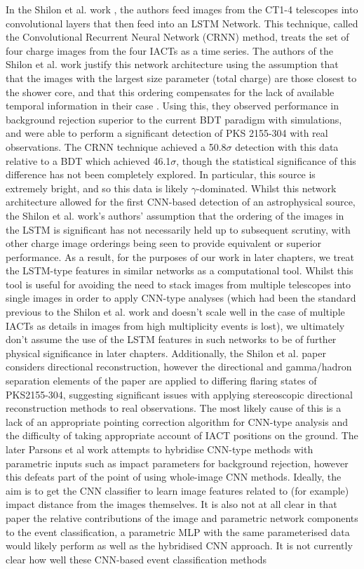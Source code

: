 In the Shilon et al. work \cite{Shilon}, the authors feed images from the CT1-4 telescopes into convolutional layers that then feed into an LSTM Network. This technique, called the Convolutional Recurrent Neural Network (CRNN) method, treats the set of four charge images from the four IACTs as a time series. The authors of the Shilon et al. work justify this network architecture using the assumption that that the images with the largest size parameter (total charge) are those closest to the shower core, and that this ordering compensates for the lack of available temporal information in their case \cite{Shilon}. Using this, they observed performance in background rejection superior to the current BDT paradigm with simulations, and were able to perform a significant detection of PKS 2155-304 with real observations. The CRNN technique achieved a 50.8$\sigma$ detection with this data relative to a BDT which achieved 46.1$\sigma$, though the statistical significance of this difference has not been completely explored. In particular, this source is extremely bright, and so this data is likely $\gamma$-dominated. Whilst this network architecture allowed for the first CNN-based detection of an astrophysical source, the Shilon et al. work's authors' assumption that the ordering of the images in the LSTM is significant has not necessarily held up to subsequent scrutiny, with other charge image orderings \cite{ariconf} being seen to provide equivalent or superior performance. As a result, for the purposes of our work in later chapters, we treat the LSTM-type features in similar networks as a computational tool. Whilst this tool is useful for avoiding the need to stack images from multiple telescopes into single images in order to apply CNN-type analyses (which had been the standard previous to the Shilon et al. work and doesn't scale well in the case of multiple IACTs \cite{Shilon}\cite{salvatore} as details in images from high multiplicity events is lost), we ultimately don't assume the use of the LSTM features in such networks to be of further physical significance in later chapters. Additionally, the Shilon et al. paper considers directional reconstruction, however the directional and gamma/hadron separation elements of the paper are applied to differing flaring states of PKS2155-304, suggesting significant issues with applying stereoscopic directional reconstruction methods to real observations. The most likely cause of this is a lack of an appropriate pointing correction algorithm for CNN-type analysis and the difficulty of taking appropriate account of IACT positions on the ground. The later Parsons et al \cite{ParsonsOhm} work attempts to hybridise CNN-type methods with parametric inputs such as impact parameters for background rejection, however this defeats part of the point of using whole-image CNN methods. Ideally, the aim is to get the CNN classifier to learn image features related to (for example) impact distance from the images themselves. It is also not at all clear in that paper the relative contributions of the image and parametric network components to the event classification, a parametric MLP with the same parameterised data would likely perform as well as the hybridised CNN approach. It is not currently clear how well these CNN-based event classification methods 